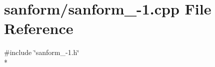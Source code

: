 \hypertarget{sanform__1-1_8cpp}{}\section{sanform/sanform\+\_-\/1.cpp File Reference}
\label{sanform__1-1_8cpp}
{\ttfamily \#include \char`\"{}sanform\+\_-\/1.\+h\char`\"{}}\\*
